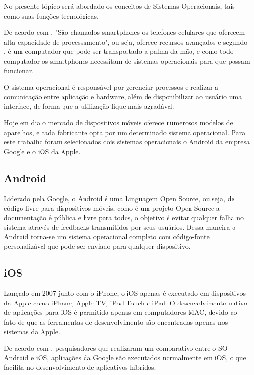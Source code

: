 No presente tópico será abordado os conceitos de Sistemas Operacionais, tais como suas funções tecnológicas.

De acordo com , "São chamados smartphones os telefones celulares que oferecem alta capacidade de processamento", ou seja, oferece recursos avançados e segundo , é um computador que pode ser transportado a palma da mão, e como todo computador os smartphones necessitam de sistemas operacionais para que possam funcionar.

O sistema operacional é responsável por gerenciar processos e realizar a comunicação entre aplicação e hardware, além de disponibilizar ao usuário uma interface, de forma que a utilização fique mais agradável. \cite {velloso2014informatica}

Hoje em dia o mercado de dispositivos móveis oferece numerosos modelos de aparelhos, e cada fabricante opta por um determinado sistema operacional. Para este trabalho foram selecionados dois sistemas operacionais o Android da empresa Google e o iOS da Apple. 

\subsection{Android}

Liderado pela Google, o Android é uma Linguagem Open Source, ou seja, de código livre para dispositivos móveis, como é um projeto Open Source a documentação é pública e livre para todos, o objetivo é evitar qualquer falha no sistema através de feedbacks transmitidos por seus usuários. Dessa maneira o Android torna-se um sistema operacional completo com código-fonte personalizável que pode ser enviado para qualquer dispositivo.


\subsection{iOS}

Lançado em 2007 junto com o iPhone, o iOS apenas é executado em dispositivos da Apple como iPhone, Apple TV, iPod Touch e iPad. O desenvolvimento nativo de aplicações para iOS é permitido apenas em computadores MAC, devido ao fato de que as ferramentas de desenvolvimento são encontradas apenas nos sistemas da Apple.\cite{garbin2014sistema}

De acordo com , pesquisadores que realizaram um comparativo entre o SO Android e iOS, aplicações da Google são executados normalmente em iOS, o que facilita no desenvolvimento de aplicativos híbridos.

